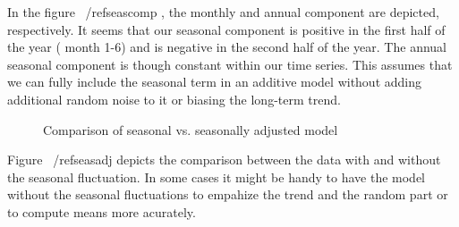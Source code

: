\documentclass[11pt, a4paper]{article} %
\begin{document}
In the figure ~/ref{seascomp} , the monthly and annual component are depicted, respectively. It seems that our seasonal component is positive in the first half of the year ( month 1-6) and is negative in the second half of the year. The annual seasonal component is though constant within our time series. This assumes that we can fully include the seasonal term in an additive model without adding additional random noise to it or biasing the long-term trend. 

\begin{Schunk}
\end{Schunk}

\begin{figure}[ht]
\begin{center}
\qquad
{}
\end{center}
\caption{Comparison of seasonal vs. seasonally adjusted model}
\label{seasadj}
\end{figure}

\noindent Figure  ~/ref{seasadj} depicts the comparison between the data with and without the seasonal fluctuation. In some cases it might be handy to have the model without the seasonal fluctuations to empahize the trend and the random part or to compute means more acurately.  
\end{document}
